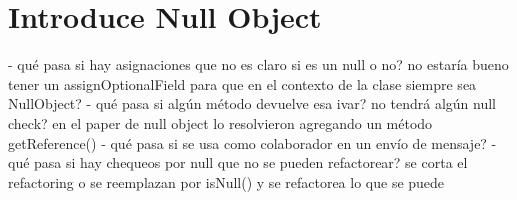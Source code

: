 \section{Introduce Null Object}



- qué pasa si hay asignaciones que no es claro si es un null o no?
no estaría bueno tener un assignOptionalField para que en el contexto de la clase siempre sea NullObject?
- qué pasa si algún método devuelve esa ivar? no tendrá algún null check?
en el paper de null object lo resolvieron agregando un método getReference()
- qué pasa si se usa como colaborador en un envío de mensaje?
- qué pasa si hay chequeos por null que no se pueden refactorear?
se corta el refactoring o se reemplazan por isNull() y se refactorea lo que se puede